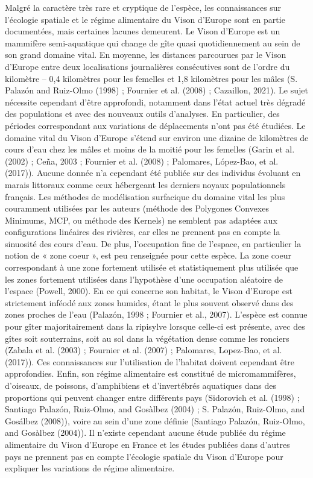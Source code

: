 \documentclass[
  letterpaper,
  DIV=11,
  numbers=noendperiod]{scrreprt}
\begin{document}
Malgré la caractère très rare et cryptique de l'espèce, les
connaissances sur l'écologie spatiale et le régime alimentaire du Vison
d'Europe sont en partie documentées, mais certaines lacunes demeurent.
Le Vison d'Europe est un mammifère semi-aquatique qui change de gîte
quasi quotidiennement au sein de son grand domaine vital. En moyenne,
les distances parcourues par le Vison d'Europe entre deux localisations
journalières consécutives sont de l'ordre du kilomètre -- 0,4 kilomètres
pour les femelles et 1,8 kilomètres pour les mâles (S. Palazón and
Ruiz-Olmo (1998) ; Fournier et al. (2008) ; Cazaillon, 2021). Le sujet
nécessite cependant d'être approfondi, notamment dans l'état actuel très
dégradé des populations et avec des nouveaux outils d'analyses. En
particulier, des périodes correspondant aux variations de déplacements
n'ont pas été étudiées. Le domaine vital du Vison d'Europe s'étend sur
environ une dizaine de kilomètres de cours d'eau chez les mâles et moins
de la moitié pour les femelles (Garin et al. (2002) ; Ceña, 2003 ;
Fournier et al. (2008) ; Palomares, López-Bao, et al. (2017)). Aucune
donnée n'a cependant été publiée sur des individus évoluant en marais
littoraux comme ceux hébergeant les derniers noyaux populationnels
français. Les méthodes de modélisation surfacique du domaine vital les
plus couramment utilisées par les auteurs (méthode des Polygones
Convexes Minimums, MCP, ou méthode des Kernels) ne semblent pas adaptées
aux configurations linéaires des rivières, car elles ne prennent pas en
compte la sinuosité des cours d'eau. De plus, l'occupation fine de
l'espace, en particulier la notion de « zone coeur », est peu renseignée
pour cette espèce. La zone coeur correspondant à une zone fortement
utilisée et statistiquement plus utilisée que les zones fortement
utilisées dans l'hypothèse d'une occupation aléatoire de l'espace
(Powell, 2000). En ce qui concerne son habitat, le Vison d'Europe est
strictement inféodé aux zones humides, étant le plus souvent observé
dans des zones proches de l'eau (Palazón, 1998 ; Fournier et al., 2007).
L'espèce est connue pour gîter majoritairement dans la ripisylve lorsque
celle-ci est présente, avec des gîtes soit souterrains, soit au sol dans
la végétation dense comme les ronciers (Zabala et al. (2003) ; Fournier
et al. (2007) ; Palomares, Lopez-Bao, et al. (2017)). Ces connaissances
sur l'utilisation de l'habitat doivent cependant être approfondies.
Enfin, son régime alimentaire est constitué de micromammifères,
d'oiseaux, de poissons, d'amphibiens et d'invertébrés aquatiques dans
des proportions qui peuvent changer entre différents pays (Sidorovich et
al. (1998) ; Santiago Palazón, Ruiz-Olmo, and Gosàlbez (2004) ; S.
Palazón, Ruiz-Olmo, and Gosálbez (2008)), voire au sein d'une zone
définie (Santiago Palazón, Ruiz-Olmo, and Gosàlbez (2004)). Il n'existe
cependant aucune étude publiée du régime alimentaire du Vison d'Europe
en France et les études publiées dans d'autres pays ne prennent pas en
compte l'écologie spatiale du Vison d'Europe pour expliquer les
variations de régime alimentaire.
\end{document}
